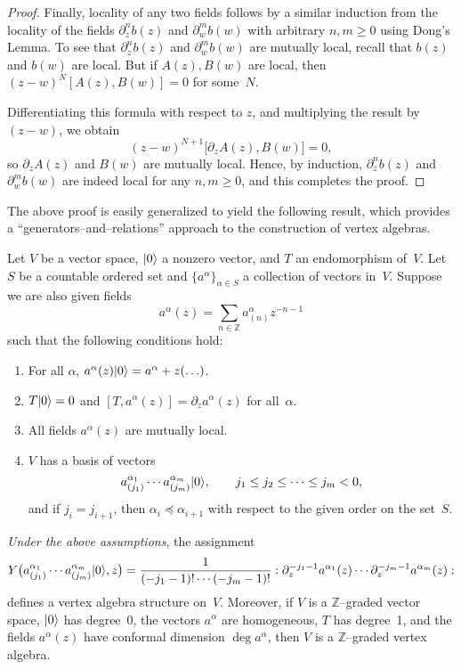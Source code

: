 \documentclass[12pt]{article}
\begin{document}
\begin{proof}
Finally, locality of any two fields follows by a similar induction from the locality
of the fields $\partial_z^n b(z)$ and $\partial_w^m b(w)$ with arbitrary $n,m\ge0$
using Dong’s Lemma.
To see that $\partial_z^n b(z)$ and $\partial_w^m b(w)$ are mutually local,
recall that $b(z)$ and $b(w)$ are local.
But if $A(z),B(w)$ are local, then $(z-w)^N [A(z),B(w)]=0$ for some~$N$.

Differentiating this formula with respect to $z$, and multiplying the result by $(z-w)$,
we obtain
\[
(z-w)^{N+1}\big[\partial_z A(z),B(w)\big]=0,
\]
so $\partial_z A(z)$ and $B(w)$ are mutually local.
Hence, by induction, $\partial_z^n b(z)$ and $\partial_w^m b(w)$
are indeed local for any $n,m\ge0$, and this completes the proof.
\end{proof}

The above proof is easily generalized to yield the following result,
which provides a ``generators–and–relations'' approach to the construction of vertex algebras.

Let $V$ be a vector space, $\lvert 0 \rangle$ a nonzero vector, and $T$ an endomorphism of~$V$.
Let $S$ be a countable ordered set and $\{a^\alpha\}_{\alpha\in S}$ a collection of vectors in~$V$.
Suppose we are also given fields
\[
a^\alpha(z) = \sum_{n\in\mathbb{Z}} a^\alpha_{(n)} z^{-n-1}
\]
such that the following conditions hold:
\begin{enumerate}
\item For all $\alpha$, $a^\alpha(z)\lvert 0 \rangle = a^\alpha + z(\ldots)$.
\item $T\lvert 0 \rangle=0$ and $[T,a^\alpha(z)] = \partial_z a^\alpha(z)$ for all~$\alpha$.
\item All fields $a^\alpha(z)$ are mutually local.
\item $V$ has a basis of vectors
\[
a^{\alpha_1}_{(j_1)} \cdots a^{\alpha_m}_{(j_m)} \lvert 0 \rangle,
\qquad
j_1\le j_2 \le \cdots \le j_m < 0,
\]
and if $j_i=j_{i+1}$, then $\alpha_i \preceq \alpha_{i+1}$
with respect to the given order on the set~$S$.
\end{enumerate}

\begin{theorem}
\emph{Under the above assumptions}, the assignment
\begin{equation}\label{2.3.8}
Y\big(a^{\alpha_1}_{(j_1)}\cdots a^{\alpha_m}_{(j_m)}\lvert 0 \rangle,z\big)
=\frac{1}{(-j_1-1)!\cdots(-j_m-1)!}
:\partial_z^{-j_1-1} a^{\alpha_1}(z)\cdots \partial_z^{-j_m-1} a^{\alpha_m}(z):
\end{equation}
defines a vertex algebra structure on~$V$.
Moreover, if $V$ is a $\mathbb{Z}$–graded vector space,
$\lvert 0 \rangle$ has degree~0, the vectors $a^\alpha$ are homogeneous,
$T$ has degree~1, and the fields $a^\alpha(z)$ have conformal dimension
$\deg a^\alpha$, then $V$ is a $\mathbb{Z}$–graded vertex algebra.
\end{theorem}
\end{document}
